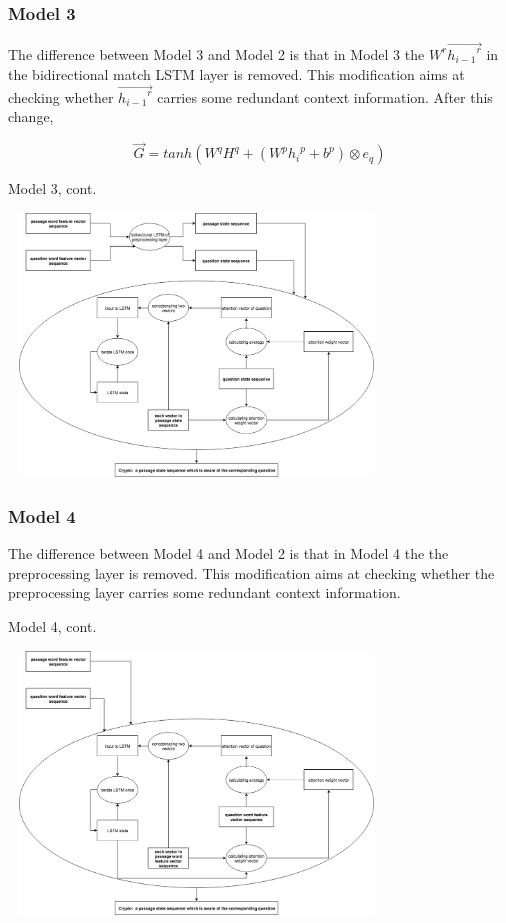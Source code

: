 \documentclass{beamer}
\begin{document}
\begin{frame} \frametitle{Model 3}
    The difference between Model 3 and Model 2 is that in Model 3 the $W^r\overrightarrow{{h_{i-1}}^r}$ in the bidirectional match LSTM layer is removed. This modification aims at checking whether $\overrightarrow{{h_{i-1}}^r}$ carries some redundant context information. After this change,


    $$\overrightarrow{G} = tanh(W^qH^q + (W^p{h_i}^p + b^p) \otimes e_q)$$
\end{frame}

\begin{frame}{Model 3, cont.}
    \begin{center}
        \includegraphics[width=10cm, height=7cm]{figures/model3_encoder.png}
    \end{center}
\end{frame}

\begin{frame} \frametitle{Model 4}
    The difference between Model 4 and Model 2 is that in Model 4 the the preprocessing layer is removed. This modification aims at checking whether the preprocessing layer carries some redundant context information.
\end{frame}

\begin{frame}{Model 4, cont.}
    \begin{center}
        \includegraphics[width=10cm, height=7cm]{figures/model4_encoder.png}
    \end{center}
\end{frame}
\end{document}
